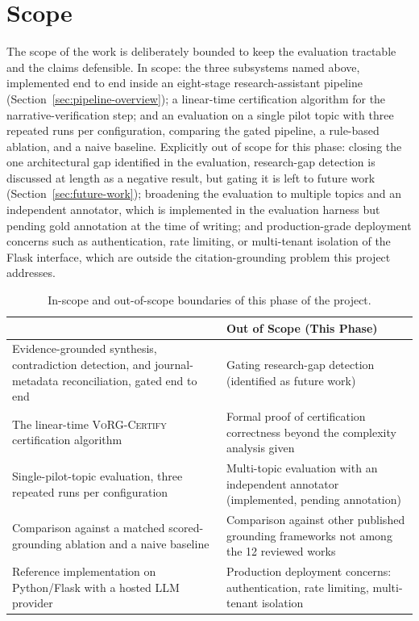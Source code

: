 \documentclass[12pt,a4paper]{report}
\newcommand{\headrow}{\rowcolor{navy}}
\newcommand{\hd}[1]{{\color{white}\bfseries #1}}
\begin{document}
\section{Scope}
The scope of the work is deliberately bounded to keep the evaluation
tractable and the claims defensible. In scope: the three subsystems named
above, implemented end to end inside an eight-stage research-assistant
pipeline (Section~\ref{sec:pipeline-overview}); a linear-time certification
algorithm for the narrative-verification step; and an evaluation on a single
pilot topic with three repeated runs per configuration, comparing the gated
pipeline, a rule-based ablation, and a naive baseline. Explicitly out of scope
for this phase: closing the one architectural gap identified in the
evaluation, research-gap detection is discussed at length as a negative
result, but gating it is left to future work (Section~\ref{sec:future-work});
broadening the evaluation to multiple topics and an independent annotator,
which is implemented in the evaluation harness but pending gold annotation at
the time of writing; and production-grade deployment concerns such as
authentication, rate limiting, or multi-tenant isolation of the Flask
interface, which are outside the citation-grounding problem this project
addresses.

\begin{table}[H]
\centering
\caption{In-scope and out-of-scope boundaries of this phase of the project.}
\label{tab:scope}
\begin{tabular}{@{}p{6.6cm}p{6.6cm}@{}}
\toprule
\headrow \hd{In Scope} & \hd{Out of Scope (This Phase)} \\
\midrule
Evidence-grounded synthesis, contradiction detection, and journal-metadata
reconciliation, gated end to end &
Gating research-gap detection (identified as future work) \\
The linear-time \textsc{VoRG-Certify} certification algorithm &
Formal proof of certification correctness beyond the complexity analysis given \\
Single-pilot-topic evaluation, three repeated runs per configuration &
Multi-topic evaluation with an independent annotator (implemented, pending
annotation) \\
Comparison against a matched scored-grounding ablation and a naive baseline &
Comparison against other published grounding frameworks not among the 12
reviewed works \\
Reference implementation on Python/Flask with a hosted LLM provider &
Production deployment concerns: authentication, rate limiting, multi-tenant
isolation \\
\bottomrule
\end{tabular}
\end{table}
\end{document}
